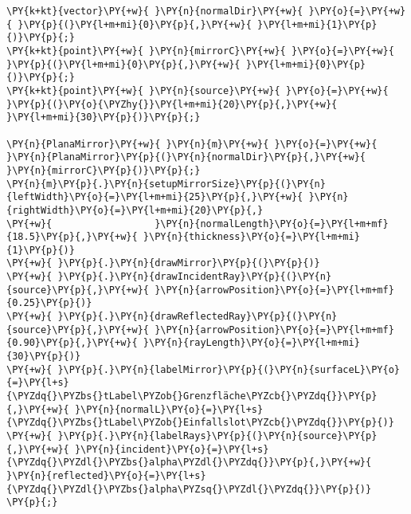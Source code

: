 \begin{Verbatim}[commandchars=\\\{\}]
\PY{k+kt}{vector}\PY{+w}{ }\PY{n}{normalDir}\PY{+w}{ }\PY{o}{=}\PY{+w}{ }\PY{p}{(}\PY{l+m+mi}{0}\PY{p}{,}\PY{+w}{ }\PY{l+m+mi}{1}\PY{p}{)}\PY{p}{;}
\PY{k+kt}{point}\PY{+w}{ }\PY{n}{mirrorC}\PY{+w}{ }\PY{o}{=}\PY{+w}{ }\PY{p}{(}\PY{l+m+mi}{0}\PY{p}{,}\PY{+w}{ }\PY{l+m+mi}{0}\PY{p}{)}\PY{p}{;}
\PY{k+kt}{point}\PY{+w}{ }\PY{n}{source}\PY{+w}{ }\PY{o}{=}\PY{+w}{ }\PY{p}{(}\PY{o}{\PYZhy{}}\PY{l+m+mi}{20}\PY{p}{,}\PY{+w}{ }\PY{l+m+mi}{30}\PY{p}{)}\PY{p}{;}

\PY{n}{PlanaMirror}\PY{+w}{ }\PY{n}{m}\PY{+w}{ }\PY{o}{=}\PY{+w}{ }\PY{n}{PlanaMirror}\PY{p}{(}\PY{n}{normalDir}\PY{p}{,}\PY{+w}{ }\PY{n}{mirrorC}\PY{p}{)}\PY{p}{;}
\PY{n}{m}\PY{p}{.}\PY{n}{setupMirrorSize}\PY{p}{(}\PY{n}{leftWidth}\PY{o}{=}\PY{l+m+mi}{25}\PY{p}{,}\PY{+w}{ }\PY{n}{rightWidth}\PY{o}{=}\PY{l+m+mi}{20}\PY{p}{,}
\PY{+w}{                  }\PY{n}{normalLength}\PY{o}{=}\PY{l+m+mf}{18.5}\PY{p}{,}\PY{+w}{ }\PY{n}{thickness}\PY{o}{=}\PY{l+m+mi}{1}\PY{p}{)}
\PY{+w}{ }\PY{p}{.}\PY{n}{drawMirror}\PY{p}{(}\PY{p}{)}
\PY{+w}{ }\PY{p}{.}\PY{n}{drawIncidentRay}\PY{p}{(}\PY{n}{source}\PY{p}{,}\PY{+w}{ }\PY{n}{arrowPosition}\PY{o}{=}\PY{l+m+mf}{0.25}\PY{p}{)}
\PY{+w}{ }\PY{p}{.}\PY{n}{drawReflectedRay}\PY{p}{(}\PY{n}{source}\PY{p}{,}\PY{+w}{ }\PY{n}{arrowPosition}\PY{o}{=}\PY{l+m+mf}{0.90}\PY{p}{,}\PY{+w}{ }\PY{n}{rayLength}\PY{o}{=}\PY{l+m+mi}{30}\PY{p}{)}
\PY{+w}{ }\PY{p}{.}\PY{n}{labelMirror}\PY{p}{(}\PY{n}{surfaceL}\PY{o}{=}\PY{l+s}{\PYZdq{}\PYZbs{}tLabel\PYZob{}Grenzfläche\PYZcb{}\PYZdq{}}\PY{p}{,}\PY{+w}{ }\PY{n}{normalL}\PY{o}{=}\PY{l+s}{\PYZdq{}\PYZbs{}tLabel\PYZob{}Einfallslot\PYZcb{}\PYZdq{}}\PY{p}{)}
\PY{+w}{ }\PY{p}{.}\PY{n}{labelRays}\PY{p}{(}\PY{n}{source}\PY{p}{,}\PY{+w}{ }\PY{n}{incident}\PY{o}{=}\PY{l+s}{\PYZdq{}\PYZdl{}\PYZbs{}alpha\PYZdl{}\PYZdq{}}\PY{p}{,}\PY{+w}{ }\PY{n}{reflected}\PY{o}{=}\PY{l+s}{\PYZdq{}\PYZdl{}\PYZbs{}alpha\PYZsq{}\PYZdl{}\PYZdq{}}\PY{p}{)}
\PY{p}{;}
\end{Verbatim}
